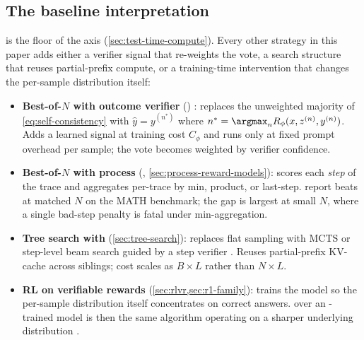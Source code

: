 \subsection{The baseline interpretation}
\label{sec:sc-baseline}

 is the floor of the  axis
(\cref{sec:test-time-compute}). Every other strategy in this paper
adds either a verifier signal that re-weights the vote, a search
structure that reuses partial-prefix compute, or a training-time
intervention that changes the per-sample distribution itself:

\begin{itemize}
\item \textbf{Best-of-$N$ with outcome verifier} ()
\citep[\S 2]{lightman2023-prm800k}: replaces the unweighted majority of
\cref{eq:self-consistency} with $\hat y = y^{(n^*)}$ where $n^* =
\argmax_n R_\phi(x, z^{(n)}, y^{(n)})$. Adds a learned signal at
training cost $C_\phi$ and runs only at fixed prompt overhead per
sample; the vote becomes weighted by verifier confidence.

\item \textbf{Best-of-$N$ with process } (, \cref{sec:process-reward-models}):
scores each \emph{step} of the trace and aggregates per-trace by min,
product, or last-step. \citet[\S 4]{lightman2023-prm800k} report 
beats  at matched $N$ on the MATH benchmark; the gap is largest
at small $N$, where a single bad-step penalty is fatal under
min-aggregation.

\item \textbf{Tree search with } (\cref{sec:tree-search}): replaces
flat sampling with MCTS or step-level beam search guided by a step
verifier \citep[\S 3]{rstar-math2025}. Reuses partial-prefix KV-cache
across siblings; cost scales as $B \times L$ rather than $N \times L$.

\item \textbf{RL on verifiable rewards} (\cref{sec:rlvr,sec:r1-family}):
trains the model so the per-sample distribution itself concentrates on
correct answers.  over an -trained model is then
the same algorithm operating on a sharper underlying distribution
\citep[\S 2.3]{deepseek-r1}.
\end{itemize}

